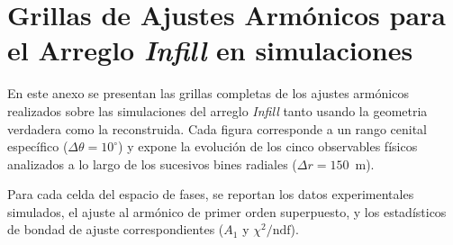 \chapter{Grillas de Ajustes Armónicos para el Arreglo \textit{Infill} en simulaciones}
\label{anexo:ajustes_infill}

En este anexo se presentan las grillas completas de los ajustes armónicos realizados sobre las simulaciones del arreglo \textit{Infill} tanto usando la geometria verdadera como la reconstruida. Cada figura corresponde a un rango cenital específico ($\Delta\theta = 10^\circ$) y expone la evolución de los cinco observables físicos analizados a lo largo de los sucesivos bines radiales ($\Delta r = 150$~m). 

Para cada celda del espacio de fases, se reportan los datos experimentales simulados, el ajuste al armónico de primer orden superpuesto, y los estadísticos de bondad de ajuste correspondientes ($A_1$ y $\chi^2/\text{ndf}$).

\newpage


